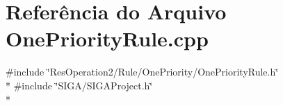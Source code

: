 \section{Referência do Arquivo One\+Priority\+Rule.\+cpp}
\label{_one_priority_rule_8cpp}
{\ttfamily \#include \char`\"{}Res\+Operation2/\+Rule/\+One\+Priority/\+One\+Priority\+Rule.\+h\char`\"{}}\\*
{\ttfamily \#include \char`\"{}S\+I\+G\+A/\+S\+I\+G\+A\+Project.\+h\char`\"{}}\\*
